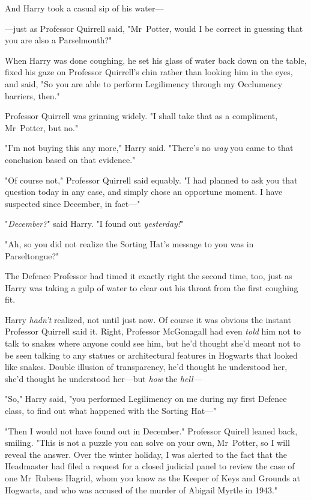 And Harry took a casual sip of his water—

—just as Professor Quirrell said, "Mr~Potter, would I be correct in guessing
that you are also a Parselmouth?"

When Harry was done coughing, he set his glass of water back down on the table,
fixed his gaze on Professor Quirrell's chin rather than looking him in the
eyes, and said, "So you are able to perform Legilimency through my Occlumency
barriers, then."

Professor Quirrell was grinning widely. "I shall take that as a compliment,
Mr~Potter, but no."

"I'm not buying this any more," Harry said. "There's no \emph{way} you came to
that conclusion based on that evidence."

"Of course not," Professor Quirrell said equably. "I had planned to ask you
that question today in any case, and simply chose an opportune moment. I have
suspected since December, in fact—"

"\emph{December?}" said Harry. "I found out \emph{yesterday!}"

"Ah, so you did not realize the Sorting Hat's message to you was in
Parseltongue?"

The Defence Professor had timed it exactly right the second time, too, just as
Harry was taking a gulp of water to clear out his throat from the first
coughing fit.

Harry \emph{hadn't} realized, not until just now. Of course it was obvious the
instant Professor Quirrell said it. Right, Professor McGonagall had even
\emph{told} him not to talk to snakes where anyone could see him, but he'd
thought she'd meant not to be seen talking to any statues or architectural
features in Hogwarts that looked like snakes. Double illusion of transparency,
he'd thought he understood her, she'd thought he understood her—but
\emph{how} the \emph{hell—}

"So," Harry said, "you performed Legilimency on me during my first Defence
class, to find out what happened with the Sorting Hat—"

"Then I would not have found out in December." Professor Quirell leaned back,
smiling. "This is not a puzzle you can solve on your own, Mr~Potter, so I will
reveal the answer. Over the winter holiday, I was alerted to the fact that the
Headmaster had filed a request for a closed judicial panel to review the case
of one Mr~Rubeus Hagrid, whom you know as the Keeper of Keys and Grounds at
Hogwarts, and who was accused of the murder of Abigail Myrtle in 1943."

